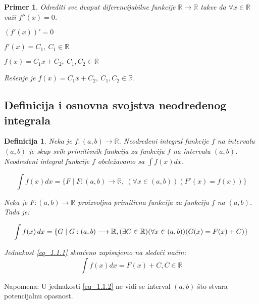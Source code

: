 \documentclass{article}
\newtheorem{definicija}{Definicija}[section]
\newtheorem{prim}{Primer}[section]
\begin{document}
\begin{primbox}
    \begin{prim}
        Odrediti sve dvaput diferencijabilne funkcije
        $\mathbb{R} \longrightarrow \mathbb{R}$ takve da
        $\forall x \in \mathbb{R}$ važi $f''(x) = 0$.\par
        $(f'(x))' = 0$\par
        $f'(x) = C_1,\  C_1 \in \mathbb{R}$ \par
        $f(x) = C_1x+C_2,\ C_1,C_2 \in \mathbb{R}$ \par
        Rešenje je $f(x) = C_1x + C_2,\ C_1, C_2 \in \mathbb{R}$.
    \end{prim}
\end{primbox}

\subsection{Definicija i osnovna svojstva neodređenog integrala}
\begin{defbox}
    \begin{definicija}
        Neka je $f: (a, b) \longrightarrow \mathbb{R}$.
        Neodređeni integral funkcije $f$ na intervalu $(a, b)$ je
        skup svih primitivnih funkcija za funkciju $f$ na intervalu
        $(a, b)$. Neodređeni integral funkcije $f$ obeležavamo sa
        $\int f(x)dx$.\par
        $$\int f(x) dx = \{F \mid F: (a, b) \longrightarrow \mathbb{R},\
            (\forall x\in(a,b))(F'(x) = f(x))\}$$\par
        Neka je $F: (a,b) \longrightarrow \mathbb{R}$ proizvoljna
        primitivna funkcija za funkciju $f$ na $(a,b)$. Tada je: \par

        \setcounter{equation}{0}

        \begin{equation} \label{eq_1.1.1}
            \int f(x) \, dx =\{G \mid G: (a, b)
            \longrightarrow \mathbb{R}, \\
            (\exists C \in \mathbb{R}) (\forall x \in (a, b))
            (G(x) = F(x) + C)\}
        \end{equation}

        Jednakost \eqref{eq_1.1.1} skraćeno zapisujemo na sledeći način:
        \begin{equation}\label{eq_1.1.2}
            \int f(x)dx = F(x) + C, C\in\mathbb{R}
        \end{equation}
    \end{definicija}
    Napomena: U jednakosti \eqref{eq_1.1.2} ne vidi se interval $(a, b)$ što
    stvara potencijalnu opasnost.
\end{defbox}
\end{document}
